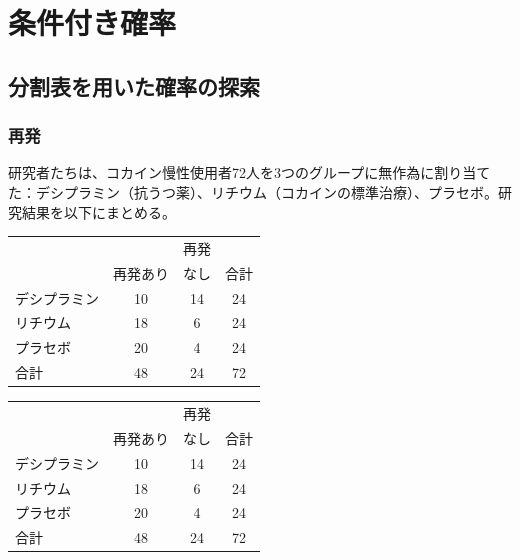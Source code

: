 
\section{条件付き確率}


\subsection{分割表を用いた確率の探索}


\begin{frame}
\frametitle{再発}

研究者たちは、コカイン慢性使用者72人を3つのグループに無作為に割り当てた：デシプラミン（抗うつ薬）、リチウム（コカインの標準治療）、プラセボ。研究結果を以下にまとめる。

{\small
\begin{center}
\begin{tabular}{l | c c | c}
			& 		& 再発 		&  \\
			& 再発あり	& なし	& 合計 \\
\hline
デシプラミン	& 10		& 14		& 24 \\
リチウム		& 18		& 6		& 24 \\
プラセボ		& 20		& 4		& 24 \\
\hline
合計			& 48		& 24		& 72
\end{tabular}
\end{center}
}


\end{frame}


\begin{frame}



{\small
\begin{center}
\begin{tabular}{l | c c | c}
			& 		& 再発 		&  \\
			& 再発あり	& なし	& 合計 \\
\hline
デシプラミン	& 10		& 14		& 24 \\
リチウム		& 18		& 6		& 24 \\
プラセボ		& 20		& 4		& 24 \\
\hline
合計			& 48		& 24		& 72
\end{tabular}
\end{center}
}

\end{frame}


